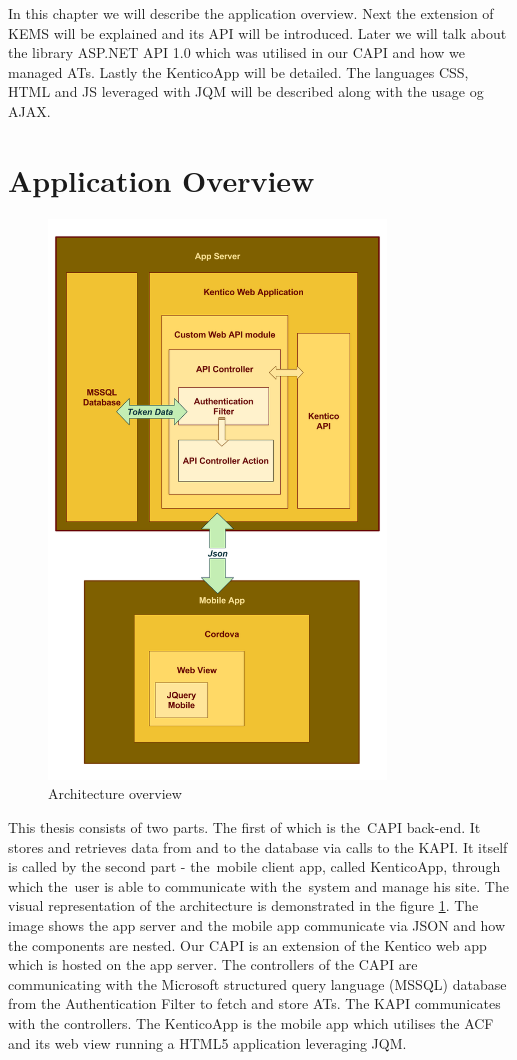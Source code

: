In this chapter we will describe the application overview. Next the extension of KEMS will be explained and its API will be introduced. Later we will talk about the library ASP.NET API 1.0 which was utilised in our CAPI and how we managed ATs. Lastly the KenticoApp will be detailed. The languages CSS, HTML and JS leveraged with JQM will be described along with the usage og AJAX.
\section{Application Overview}
\begin{figure}[ht!]
  \centering
  \includegraphics[width=0.8\textwidth]{Images/Architecture.png}
  \caption{Architecture overview}
  \label{architectureOverview}
\end{figure}
This thesis consists of two parts. The first of which is the~CAPI back-end. It stores and retrieves data from and to the database via calls to the KAPI. It itself is called by the second part - the~mobile client app, called KenticoApp, through which the~user is able to communicate with the~system and manage his site. The visual representation of the architecture is demonstrated in the figure \ref{architectureOverview}. The image shows the app server and the mobile app communicate via JSON and how the components are nested. Our CAPI is an extension of the Kentico web app which is hosted on the app server. The controllers of the CAPI are communicating with the Microsoft structured query language (MSSQL) database from the Authentication Filter to fetch and store ATs. The KAPI communicates with the controllers. The KenticoApp is the mobile app which utilises the ACF and its web view running a HTML5 application leveraging JQM. 

